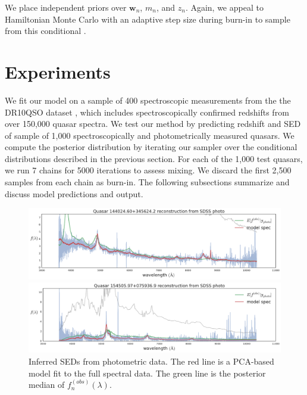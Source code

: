 \documentclass{article}
\begin{document}
We place independent priors over $\mathbf{w}_n$, $m_n$, and $z_n$.  Again, we appeal to Hamiltonian Monte Carlo with an adaptive step size during burn-in to sample from this conditional \cite{neal2011mcmc}. 

\section{Experiments}
\label{sec:experiments}
We fit our model on a sample of 400 spectroscopic measurements from the the DR10QSO dataset \cite{paris2014sloan}, which includes spectroscopically confirmed redshifts from over 150,000 quasar spectra.  
We test our method by predicting redshift and SED of sample of 1,000 spectroscopically and photometrically measured quasars.  
We compute the posterior distribution by iterating our sampler over the conditional distributions described in the previous section.  For each of the 1,000 test quasars, we run 7 chains for 5000 iterations to assess mixing.  We discard the first 2,500 samples from each chain as burn-in.  The following subsections summarize and discuss model predictions and output.  

\begin{figure}[th]
\vskip 0.2in
\begin{center}
\centerline{\includegraphics[width=2\columnwidth]{../figs/quasar_plots/quasar_56_mcmc_recon.pdf}} 
\centerline{\includegraphics[width=2\columnwidth]{../figs/quasar_plots/quasar_119_mcmc_recon.pdf}} 
\vskip -0.2in
\caption{Inferred SEDs from photometric data.  The red line is a PCA-based model fit to the full spectral data.  The green line is the posterior median of $f^{(obs)}_n(\lambda)$. }
\label{fig:recon}
\end{center}
\end{figure}
\end{document}
